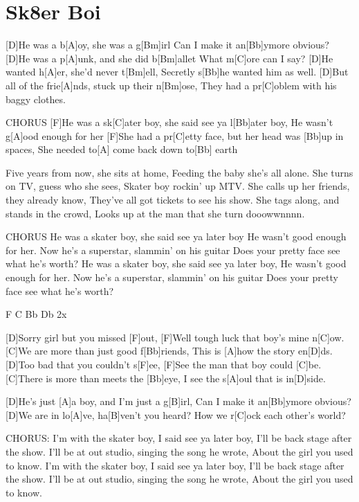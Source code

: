 \section{Sk8er Boi}
\begin{multicols}{2}
\begin{guitar}

	[D]He was a b[A]oy, she was a g[Bm]irl
	Can I make it an[Bb]ymore obvious?
	[D]He was a p[A]unk, and she did b[Bm]allet
	What m[C]ore can I say?
	[D]He wanted h[A]er, she'd never t[Bm]ell,
	Secretly s[Bb]he wanted him as well.
	[D]But all of the frie[A]nds, stuck up their n[Bm]ose,
	They had a pr[C]oblem with his baggy clothes.

	
	CHORUS
	[F]He was a sk[C]ater boy, she said see ya l[Bb]ater boy,
	He wasn't g[A]ood enough for her
	[F]She had a pr[C]etty face, but her head was [Bb]up in spaces, 
	She needed to[A] come back down to[Bb] earth

	
	Five years from now, she sits at home,
	Feeding the baby she's all alone.
	She turns on TV, guess who she sees,
	Skater boy rockin' up MTV.
	She calls up her friends, they already know,
	They've all got tickets to see his show.
	She tags along, and stands in the crowd,
	Looks up at the man that she turn dooowwnnnn.


	CHORUS
	He was a skater boy, she said see ya later boy
	He wasn't good enough for her.
	Now he's a superstar, slammin' on his guitar
	Does your pretty face see what he's worth?
	He was a skater boy, she said see ya later boy,
	He wasn't good enough for her.
	Now he's a superstar, slammin' on his guitar
	Does your pretty face see what he's worth?


	F C Bb Db 2x


	[D]Sorry girl but you missed [F]out,
	[F]Well tough luck that boy's mine n[C]ow.
	[C]We are more than just good f[Bb]riends,
	This is [A]how the story en[D]ds.
	[D]Too bad that you couldn't s[F]ee,
	[F]See the man that boy could [C]be.
	[C]There is more than meets the [Bb]eye,
	I see the s[A]oul that is in[D]side.


	[D]He's just [A]a boy, and I'm just a g[B]irl,
	Can I make it an[Bb]ymore obvious?
	[D]We are in lo[A]ve, ha[B]ven't you heard?
	How we r[C]ock each other's world?

	
	CHORUS:
	I'm with the skater boy, I said see ya later boy,
	I'll be back stage after the show.
	I'll be at out studio, singing the song he wrote,
	About the girl you used to know.
	I'm with the skater boy, I said see ya later boy,
	I'll be back stage after the show.
	I'll be at out studio, singing the song he wrote,
	About the girl you used to know.
\end{guitar}
\end{multicols}
